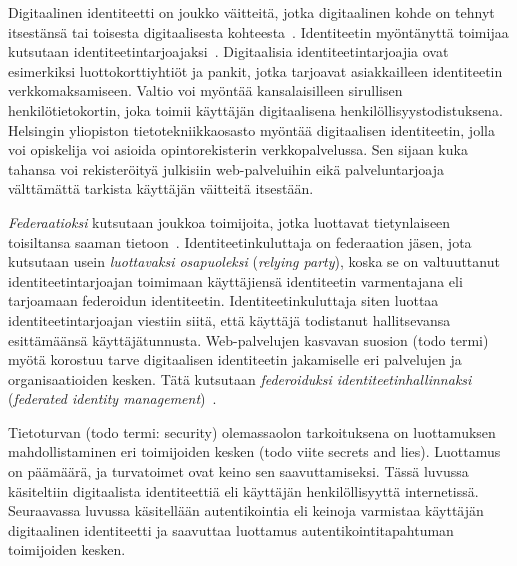 \documentclass[finnish,gradu]{tktltiki}
\begin{document}
  Digitaalinen identiteetti on joukko väitteitä, jotka digitaalinen kohde on tehnyt itsestänsä tai toisesta digitaalisesta kohteesta~\cite{cameron_laws_of_id_2005, sakimura_identity_2011}. Identiteetin myöntänyttä toimijaa kutsutaan identiteetintarjoajaksi~\cite{cameron_id_arch_2006}. Digitaalisia identiteetintarjoajia ovat esimerkiksi luottokorttiyhtiöt ja pankit, jotka tarjoavat asiakkailleen identiteetin verkkomaksamiseen. Valtio voi myöntää kansalaisilleen sirullisen henkilötietokortin, joka toimii käyttäjän digitaalisena henkilöllisyystodistuksena. Helsingin yliopiston tietotekniikkaosasto myöntää digitaalisen identiteetin, jolla voi opiskelija voi asioida opintorekisterin verkkopalvelussa. Sen sijaan kuka tahansa voi rekisteröityä julkisiin web-palveluihin eikä palveluntarjoaja välttämättä tarkista käyttäjän väitteitä itsestään.

  \emph{Federaatioksi} kutsutaan joukkoa toimijoita, jotka luottavat tietynlaiseen toisiltansa saaman tietoon~\cite{id_in_federation_systems_2005, federated_auth_case_2008}. Identiteetinkuluttaja on federaation jäsen, jota kutsutaan usein \emph{luottavaksi osapuoleksi} (\emph{relying party}), koska se on valtuuttanut identiteetintarjoajan toimimaan käyttäjiensä identiteetin varmentajana eli tarjoamaan federoidun identiteetin. Identiteetinkuluttaja siten luottaa identiteetintarjoajan viestiin siitä, että käyttäjä todistanut hallitsevansa esittämäänsä käyttäjätunnusta. Web-palvelujen kasvavan suosion (todo termi) myötä korostuu tarve digitaalisen identiteetin jakamiselle eri palvelujen ja organisaatioiden kesken. Tätä kutsutaan \emph{federoiduksi identiteetinhallinnaksi} (\emph{federated identity management})~\cite{id_in_federation_systems_2005}.

  Tietoturvan (todo termi: security) olemassaolon tarkoituksena on luottamuksen mahdollistaminen eri toimijoiden kesken (todo viite secrets and lies). Luottamus on päämäärä, ja turvatoimet ovat keino sen saavuttamiseksi. Tässä luvussa käsiteltiin digitaalista identiteettiä eli käyttäjän henkilöllisyyttä internetissä. Seuraavassa luvussa käsitellään autentikointia eli keinoja varmistaa käyttäjän digitaalinen identiteetti ja saavuttaa luottamus autentikointitapahtuman toimijoiden kesken.


\end{document}
